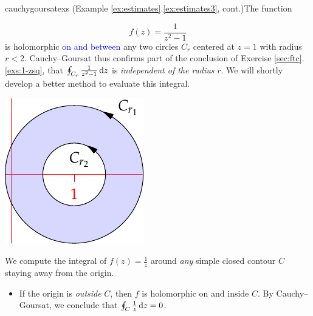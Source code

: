 \begin{examples}{}{cauchygoursatexs}
	\exstart (Example \ref*{ex:estimates}.\ref{ex:estimates3}, cont.)\lstsp The function
	\begin{enumerate}\setcounter{enumi}{1}
	  \begin{minipage}[t]{0.75\linewidth}\vspace{-17pt}
			\item[]
			\[
				f(z)=\frac 1{z^2-1}
			\]
			is holomorphic \textcolor{blue}{on and between} any two circles $C_{r}$ centered at $z=1$ with radius $r<2$. Cauchy--Goursat thus confirms part of the conclusion of Exercise \ref*{sec:ftc}.\ref{exs:1-zsq}, that $\oint_{C_r}\frac 1{z^2-1}\,{\mathrm{d} z}$ is \emph{independent of the radius} $r$.\smallbreak
			We will shortly develop a better method to evaluate this integral.
		\end{minipage}
		\hfill
		\begin{minipage}[t]{0.24\linewidth}\vspace{-20pt}
		  \flushright\includegraphics[scale=0.95]{cauchygoursat2}
		\end{minipage}

	  \item We compute the integral of $f(z)=\frac 1z$ around \emph{any} simple closed contour $C$ staying away from the origin.
	  \begin{itemize}
	    \item If the origin is \emph{outside} $C$, then $f$ is holomorphic on and inside $C$. By Cauchy--Goursat, we conclude that $\oint_C\frac 1z\,{\mathrm{d} z}=0$.
	    

\end{itemize}
\end{enumerate}
\end{examples}
